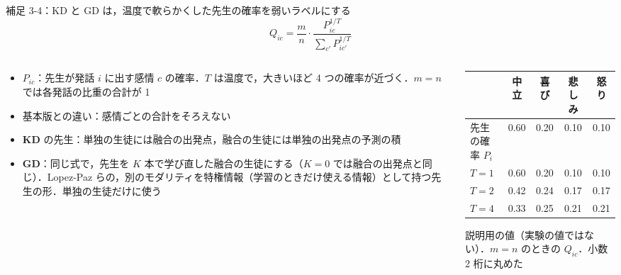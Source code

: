 \begin{frame}{補足 3-4：KD と GD は，温度で軟らかくした先生の確率を弱いラベルにする}
  \vspace{-0.3em}
  {\small\tighteq
  \begin{equation*}
    Q_{ic} = \frac{m}{n} \cdot \frac{P_{ic}^{1/T}}{\sum_{c'} P_{ic'}^{1/T}}
  \end{equation*}}
  \vspace{-0.3em}
  \begin{columns}[T,onlytextwidth]
    \begin{column}{0.53\textwidth}
      \begin{itemize}\scriptsize\setlength{\itemsep}{3pt}
        \item $P_{ic}$：先生が発話 $i$ に出す感情 $c$ の確率．$T$ は温度で，大きいほど 4 つの確率が近づく．$m = n$ では各発話の比重の合計が 1
        \item 基本版との違い：感情ごとの合計をそろえない
        \item \textbf{KD} の先生：単独の生徒には融合の出発点，融合の生徒には単独の出発点の予測の積
        \item \textbf{GD}：同じ式で，先生を $K$ 本で学び直した融合の生徒にする（$K=0$ では融合の出発点と同じ）．Lopez-Paz らの，別のモダリティを特権情報（学習のときだけ使える情報）として持つ先生の形．単独の生徒だけに使う
      \end{itemize}
    \end{column}
    \begin{column}{0.44\textwidth}
      \centering\scriptsize
      \setlength{\tabcolsep}{4pt}
      \begin{tabular}{@{}lcccc@{}}
        \toprule
        & 中立 & 喜び & 悲しみ & 怒り \\
        \midrule
        先生の確率 $P_i$ & 0.60 & 0.20 & 0.10 & 0.10 \\
        \midrule
        $T = 1$ & 0.60 & 0.20 & 0.10 & 0.10 \\
        $T = 2$ & 0.42 & 0.24 & 0.17 & 0.17 \\
        $T = 4$ & 0.33 & 0.25 & 0.21 & 0.21 \\
        \bottomrule
      \end{tabular}\par
      \vspace{0.2em}
      {\tiny 説明用の値（実験の値ではない）．$m = n$ のときの $Q_{ic}$．小数 2 桁に丸めた\par}
    \end{column}
  \end{columns}
\end{frame}

